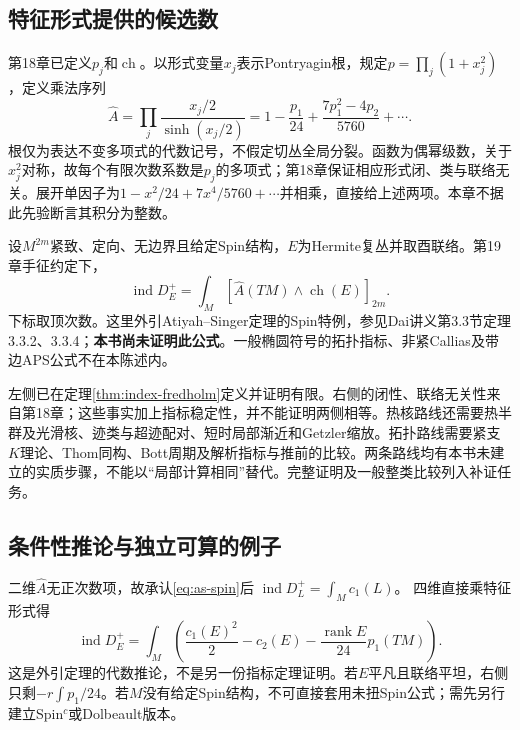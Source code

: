 \subsection{特征形式提供的候选数}
第18章已定义$p_j$和$\operatorname{ch}$。以形式变量$x_j$表示Pontryagin根，规定$p=\prod_j(1+x_j^2)$，定义乘法序列
\begin{equation}\label{eq:ahat-expansion}
 \widehat A=\prod_j\frac{x_j/2}{\sinh(x_j/2)}
 =1-\frac{p_1}{24}+\frac{7p_1^2-4p_2}{5760}+\cdots.
\end{equation}
根仅为表达不变多项式的代数记号，不假定切丛全局分裂。函数为偶幂级数，关于$x_j^2$对称，故每个有限次数系数是$p_j$的多项式；第18章保证相应形式闭、类与联络无关。展开单因子为$1-x^2/24+7x^4/5760+\cdots$并相乘，直接给上述两项。本章不据此先验断言其积分为整数。

\begin{theorem}[扭Spin指标公式；外引]\label{thm:as-external}
设$M^{2m}$紧致、定向、无边界且给定Spin结构，$E$为Hermite复丛并取酉联络。第19章手征约定下，
\begin{equation}\label{eq:as-spin}
 \operatorname{ind}D_E^+
 =\int_M[\widehat A(TM)\wedge\operatorname{ch}(E)]_{2m}.
\end{equation}
下标取顶次数。这里外引Atiyah--Singer定理的Spin特例，参见Dai讲义第3.3节定理3.3.2、3.3.4；\textbf{本书尚未证明此公式}。一般椭圆符号的拓扑指标、非紧Callias及带边APS公式不在本陈述内。
\end{theorem}

左侧已在定理\ref{thm:index-fredholm}定义并证明有限。右侧的闭性、联络无关性来自第18章；这些事实加上指标稳定性，并不能证明两侧相等。热核路线还需要热半群及光滑核、迹类与超迹配对、短时局部渐近和Getzler缩放。拓扑路线需要紧支$K$理论、Thom同构、Bott周期及解析指标与推前的比较。两条路线均有本书未建立的实质步骤，不能以“局部计算相同”替代。完整证明及一般整类比较列入补证任务。

\subsection{条件性推论与独立可算的例子}
二维$\widehat A$无正次数项，故承认\eqref{eq:as-spin}后
$\operatorname{ind}D_L^+=\int_Mc_1(L)$。
四维直接乘特征形式得
\begin{equation}\label{eq:as-four}
 \operatorname{ind}D_E^+=\int_M
 \left(\frac{c_1(E)^2}{2}-c_2(E)-\frac{\operatorname{rank}E}{24}p_1(TM)\right).
\end{equation}
这是外引定理的代数推论，不是另一份指标定理证明。若$E$平凡且联络平坦，右侧只剩$-r\int p_1/24$。若$M$没有给定Spin结构，不可直接套用未扭Spin公式；需先另行建立Spin$^c$或Dolbeault版本。

